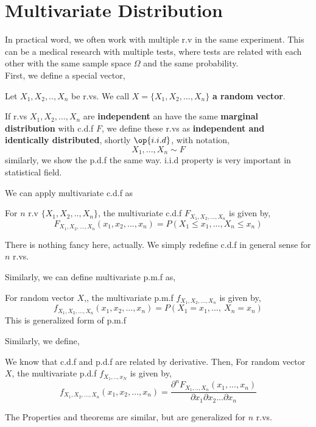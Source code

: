 \section{Multivariate Distribution}
In practical word, we often work with multiple r.v in the same experiment. This can be a medical research with multiple tests, where tests
are related with each other with the same sample space $\Omega$ and the same probability.\\
First, we define a special vector,
\begin{definition}
    Let $X_1,X_2,..,X_n$ be r.vs. We call $X = \{ X_1, X_2, ... ,X_n\}$ \textbf{a random vector}.
\end{definition}
\begin{definition}
    If r.vs $X_1,X_2,...,X_n$ are \textbf{independent} an have the same \textbf{marginal distribution} with c.d.f $F$, we define these r.vs
    as \textbf{independent and identically distributed}, shortly $\op{i.i.d}$, with notation,
    \[X_1,...,X_n \sim F\]
    similarly, we show the p.d.f the same way. i.i.d property is very important in statistical field.
\end{definition}
We can apply multivariate c.d.f as
\begin{definition}
    For $n$  r.v $\{ X_1,X_2,..,X_n \}$, the multivariate c.d.f $F_{X_1,X_2,...,X_n}$ is given by,
    \[F_{X_1,X_2,...,X_n}(x_1,x_2,...,x_n) = P(X_1 \le x_1,...,X_n \le x_n) \]
\end{definition}
There is nothing fancy here, actually. We simply redefine c.d.f in general sense for $n$ r.vs.
\par
Similarly, we can define multivariate p.m.f as,
\begin{definition} For random vector $X$,, the multivariate p.m.f  $f_{X_1,X_2,...,X_n}$ is given by,
    \[ f_{X_1,X_2,...,X_n}(x_1,x_2,...,x_n) = P(X_1=x_1 ,...,  \ X_n = x_n) \]
    This is generalized form of p.m.f

\end{definition}
Similarly, we define,
\begin{definition}
    We know that c.d.f and p.d.f are related by derivative. Then,
    For random vector $X$, the multivariate p.d.f $f_{X_1,..,x_N}$ is given by,
    \[f_{X_1,X_2,...,X_n}(x_1,x_2,...,x_n) = \frac{{\partial}^nF_{X_1,..,X_n}(x_1,...,x_n)}{\partial x_1\partial x_2...\partial x_n}\]
\end{definition}

The Properties and theorems are similar, but are generalized for $n$ r.vs.

